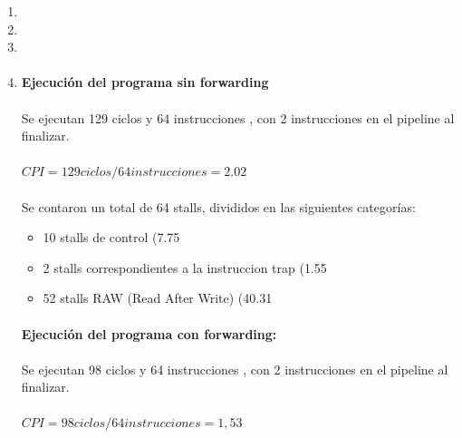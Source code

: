 \documentclass[a4paper,11pt]{article}
\begin{document}
\begin{enumerate}

\item	
\item	
\item 
\item


\paragraph{Ejecuci\'on del programa sin forwarding}


\paragraph{}
Se ejecutan 129 ciclos y 64 instrucciones , con 2 instrucciones en el  pipeline al finalizar.

\paragraph{}
\begin{center}
$CPI = 129 ciclos / 64 instrucciones = 2.02$
\end{center}

\paragraph{}
Se contaron un total de 64 stalls, divididos en las siguientes categorías:

\begin{itemize}
\item 10 stalls de control (7.75%
\item 2  stalls correspondientes a la instruccion trap (1.55%
\item 52 stalls RAW (Read After Write) (40.31%
\end{itemize}

\paragraph{Ejecuci\'on del programa con forwarding:}


\paragraph{}
Se ejecutan 98 ciclos y 64 instrucciones , con 2 instrucciones en el  pipeline al finalizar.

\paragraph{}
\begin{center}
$CPI = 98 ciclos / 64 instrucciones = 1,53$
\end{center}


\end{enumerate}
\end{document}
